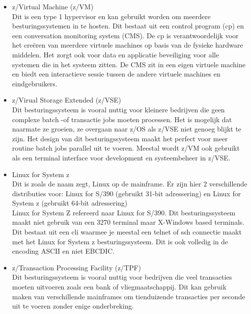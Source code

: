 \begin{itemize}
    \item z/Virtual Machine (z/VM)\\
    Dit is een type 1 hypervisor en kan gebruikt worden om meerdere besturingssystemen in te hosten. Dit bestaat uit een control program (cp) en een conversation monitoring system (CMS). De cp is verantwoordelijk voor het creëren van meerdere virtuele machines op basis van de fysieke hardware middelen. Het zorgt ook voor data en applicatie beveiliging voor alle systemen die in het systeem zitten. De CMS zit in een eigen virtuele machine en biedt een interactieve sessie tussen de andere virtuele machines en eindgebruikers. \autocite{IBMb} \\
    
    \item z/Virual Storage Extended (z/VSE) \\
    Dit besturingssysteem is vooral nuttig voor kleinere bedrijven die geen complexe batch -of transactie jobs moeten processen. Het is mogelijk dat naarmate ze groeien, ze overgaan naar z/OS als z/VSE niet genoeg blijkt te zijn. Het design van dit besturingssysteem maakt het perfect voor meer routine batch jobs parallel uit te voeren. Meestal wordt z/VM ook gebruikt als een terminal interface voor development en systeembeheer in z/VSE. \autocite{IBMb} \\
    
    \item Linux for System z \\
    Dit is zoals de naam zegt, Linux op de mainframe. Er zijn hier 2 verschillende distributies voor: Linux for S/390 (gebruikt 31-bit adressering) en Linux for System z (gebruikt 64-bit adressering) \\
    Linux for System Z refereerd naar Linux for S/390. Dit besturingssysteem maakt niet gebruik van een 3270 terminal maar X-Windows based terminals. Dit bestaat uit een cli waarmee je meestal een telnet of ssh connectie maakt met het Linux for System z besturingssysteem. Dit is ook volledig in de encoding ASCII en niet EBCDIC. \autocite{IBMb} \\
    
    \item z/Transaction Processing Facility (z/TPF) \\
    Dit besturingssysteem is vooral nuttig voor bedrijven die veel transacties moeten uitvoeren zoals een bank of vliegmaatschappij. Dit kan gebruik maken van verschillende mainframes om tienduizende transacties per seconde uit te voeren zonder enige onderbreking. \autocite{IBMb}
\end{itemize}


